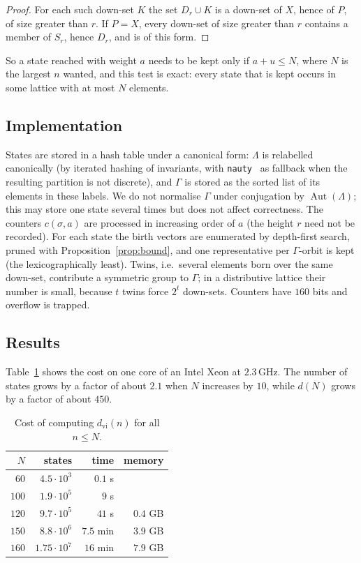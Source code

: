 \documentclass[11pt]{amsart}
\theoremstyle{definition}
\theoremstyle{remark}
\newcommand{\Aut}{\operatorname{Aut}}
\begin{document}
\begin{proof}
For each such down-set $K$ the set $D_r \cup K$ is a down-set of $X$, hence of $P$, of
size greater than $r$.  If $P = X$, every down-set of size greater than $r$ contains a
member of $S_r$, hence $D_r$, and is of this form.
\end{proof}

So a state reached with weight $a$ needs to be kept only if $a + u \le N$, where $N$
is the largest $n$ wanted, and this test is exact: every state that is kept occurs in
some lattice with at most $N$ elements.

\subsection{Implementation}
States are stored in a hash table under a canonical form: $\Lambda$ is relabelled
canonically (by iterated hashing of invariants, with \texttt{nauty}~\cite{nauty} as
fallback when the resulting partition is not discrete), and $\Gamma$ is stored as the
sorted list of its elements in these labels.  We do not normalise $\Gamma$ under
conjugation by $\Aut(\Lambda)$; this may store one state several times but does not
affect correctness.  The counters $c(\sigma,a)$ are processed in increasing order of
$a$ (the height $r$ need not be recorded).  For each state the birth vectors are
enumerated by depth-first search, pruned with Proposition~\ref{prop:bound}, and one
representative per $\Gamma$-orbit is kept (the lexicographically least).  Twins,
i.e.\ several elements born over the same down-set, contribute a symmetric group to
$\Gamma$; in a distributive lattice their number is small, because $t$ twins force
$2^t$ down-sets.  Counters have $160$ bits and overflow is trapped.

\subsection{Results}
Table~\ref{tab:cost} shows the cost on one core of an Intel Xeon at $2.3$\,GHz.  The
number of states grows by a factor of about $2.1$ when $N$ increases by $10$, while
$d(N)$ grows by a factor of about $450$.

\begin{table}[ht]
\begin{tabular}{rrrr}\toprule
$N$ & states & time & memory\\\midrule
$60$ & $4.5\cdot 10^{3}$ & $0.1$ s & \\
$100$ & $1.9\cdot 10^{5}$ & $9$ s & \\
$120$ & $9.7\cdot 10^{5}$ & $41$ s & $0.4$ GB\\
$150$ & $8.8\cdot 10^{6}$ & $7.5$ min & $3.9$ GB\\
$160$ & $1.75\cdot 10^{7}$ & $16$ min & $7.9$ GB\\\bottomrule
\end{tabular}
\caption{Cost of computing $d_{\mathrm{vi}}(n)$ for all $n \le N$.}\label{tab:cost}
\end{table}
\end{document}
